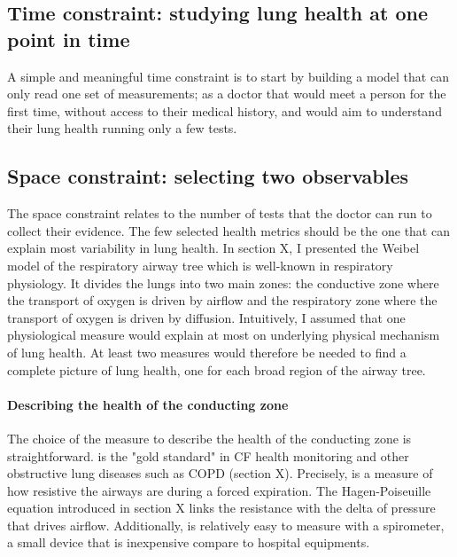 \subsection{Time constraint: studying lung health at one point in time}
A simple and meaningful time constraint is to start by building a model that can only read one set of measurements; as a doctor that would meet a person for the first time, without access to their medical history, and would aim to understand their lung health running only a few tests. 

\subsection{Space constraint: selecting two observables}
The space constraint relates to the number of tests that the doctor can run to collect their evidence. The few selected health metrics should be the one that can explain most variability in lung health. In section X, I presented the Weibel model of the respiratory airway tree which is well-known in respiratory physiology. It divides the lungs into two main zones: the conductive zone where the transport of oxygen is driven by airflow and the respiratory zone where the transport of oxygen is driven by diffusion. Intuitively, I assumed that one physiological measure would explain at most on underlying physical mechanism of lung health. At least two measures would therefore be needed to find a complete picture of lung health, one for each broad region of the airway tree. 

\paragraph{Describing the health of the conducting zone}
The choice of the measure to describe the health of the conducting zone is straightforward. \F is the "gold standard" in CF health monitoring and other obstructive lung diseases such as COPD (section X). Precisely, \F is a measure of how resistive the airways are during a forced expiration. The Hagen-Poiseuille equation introduced in section X links the resistance with the delta of pressure that drives airflow. Additionally, \F is relatively easy to measure with a spirometer, a small device that is inexpensive compare to hospital equipments.

